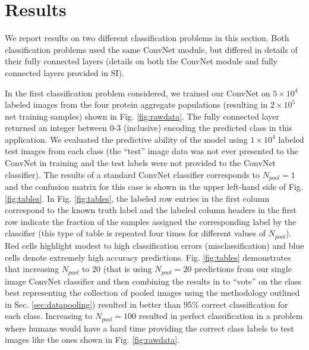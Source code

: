 \documentclass[%
reprint,
superscriptaddress,
 aps,
 pre,
]{revtex4-1}
\begin{document}



 \section{Results}
 \label{sec:Result}

We report results on two different classification problems in this section.  Both classification problems used the same ConvNet module, but differed  
in details of their fully connected layers (details on both the ConvNet module and fully connected layers provided in SI).  

In the first classification problem considered, we trained our ConvNet on $5\times 10^4$ labeled images from the four protein aggregate populations (resulting in $2\times 10^5$ net training samples) shown in Fig. \ref{fig:rawdata}.  The fully connected layer returned an integer between 0-3 (inclusive) encoding the predicted class in this  application.
We evaluated the predictive ability of the model using $1\times 10^4$ labeled  test  images from each class (the ``test'' image data was not ever presented to the ConvNet in training and the test labels were not provided to the ConvNet classifier).  The results of a standard ConvNet classifier corresponds to $N_{pool} =1$ and the confusion matrix for this case is shown in the upper left-hand side of Fig. \ref{fig:tables}.  In Fig. \ref{fig:tables}, the labeled row entries in the first column correspond to the known truth label and the labeled column headers in the first row indicate the fraction of the samples assigned the corresponding label by the classifier (this type of table is repeated four times for different values of $N_{pool}$).  Red cells highlight  modest to high classification errors (misclassification) and blue cells denote extremely high accuracy predictions.  Fig. \ref{fig:tables} demonstrates that increasing $N_{pool}$ to 20 
(that is using $N_{pool}=20$ predictions from our single image ConvNet classifier and then combining the results in to ``vote'' on the class best representing the collection of pooled images using the methodology outlined in Sec. \ref{sec:datapooling}) resulted in better than $95\%$ correct classification for each class.  Increasing 
to $N_{pool}=100$ resulted in perfect classification in a problem where humans would have a hard time providing the correct class labels to test images like the ones shown in Fig. \ref{fig:rawdata}. 
\end{document}
